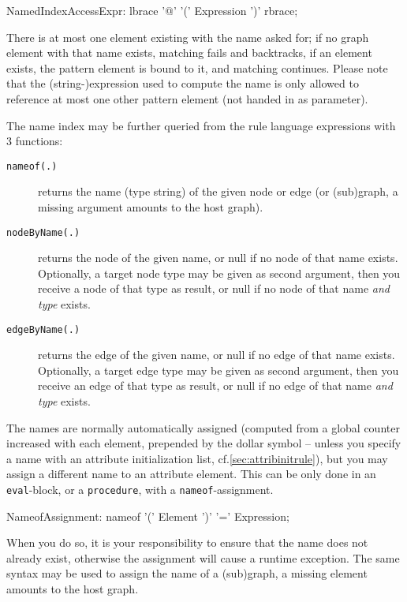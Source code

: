 \begin{rail}
  NamedIndexAccessExpr:
    lbrace '@' '(' Expression ')' rbrace;
\end{rail}

There is at most one element existing with the name asked for; if no graph element with that name exists, matching fails and backtracks, if an element exists, the pattern element is bound to it, and matching continues.
Please note that the (string-)expression used to compute the name is only allowed to reference at most one other pattern element (not handed in as parameter).

The name index may be further queried from the rule language expressions with 3 functions:
\begin{description}
\item[\texttt{nameof(.)}] returns the name (type string) of the given node or edge (or (sub)graph, a missing argument amounts to the host graph).
\item[\texttt{nodeByName(.)}] returns the node of the given name, or null if no node of that name exists. Optionally, a target node type may be given as second argument, then you receive a node of that type as result, or null if no node of that name \emph{and type} exists.
\item[\texttt{edgeByName(.)}] returns the edge of the given name, or null if no edge of that name exists. Optionally, a target edge type may be given as second argument, then you receive an edge of that type as result, or null if no edge of that name \emph{and type} exists.
\end{description}

The names are normally automatically assigned (computed from a global counter increased with each element, prepended by the dollar symbol -- unless you specify a name with an attribute initialization list, cf.\ref{sec:attribinitrule}), but you may assign a different name to an attribute element.
This can be only done in an \texttt{eval}-block, or a \texttt{procedure}, with a \texttt{nameof}-assignment.

\begin{rail}
  NameofAssignment:
    nameof '(' Element ')' '=' Expression;
\end{rail}

When you do so, it is your responsibility to ensure that the name does not already exist, otherwise the assignment will cause a runtime exception.
The same syntax may be used to assign the name of a (sub)graph, a missing element amounts to the host graph.


